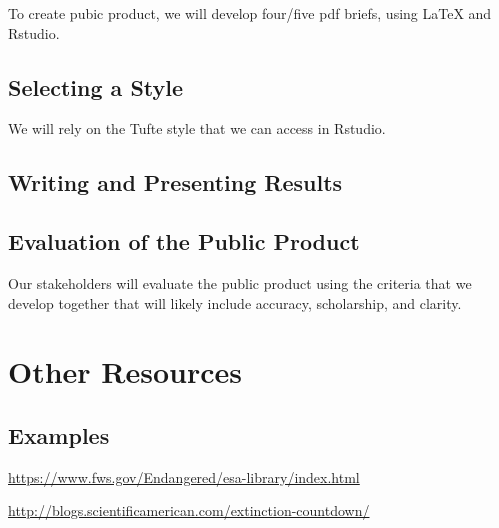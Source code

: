 \documentclass{tufte-handout}\usepackage[]{graphicx}\usepackage[]{color}
\begin{document}
To create pubic product, we will develop four/five pdf briefs, using LaTeX and Rstudio. 

\subsection{Selecting a Style}

We will rely on the Tufte style that we can access in Rstudio. 

\subsection{Writing and Presenting Results}

\subsection{Evaluation of the Public Product}

Our stakeholders will evaluate the public product using the criteria that we develop together that will likely include accuracy, scholarship, and clarity. 

\section{Other Resources}

\subsection{Examples}

\href{https://www.fws.gov/Endangered/esa-library/index.html}{https://www.fws.gov/Endangered/esa-library/index.html}

\href{http://blogs.scientificamerican.com/extinction-countdown/}{http://blogs.scientificamerican.com/extinction-countdown/}
\end{document}
